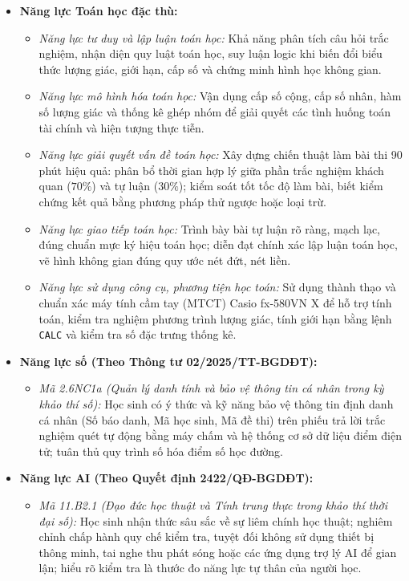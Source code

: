 \documentclass[12pt, a4paper]{article}
\begin{document}
\begin{itemize}[leftmargin=1.2cm]
    \item \textbf{Năng lực Toán học đặc thù:}
    \begin{itemize}[leftmargin=0.6cm]
        \item \textit{Năng lực tư duy và lập luận toán học:} Khả năng phân tích câu hỏi trắc nghiệm, nhận diện quy luật toán học, suy luận logic khi biến đổi biểu thức lượng giác, giới hạn, cấp số và chứng minh hình học không gian.
        \item \textit{Năng lực mô hình hóa toán học:} Vận dụng cấp số cộng, cấp số nhân, hàm số lượng giác và thống kê ghép nhóm để giải quyết các tình huống toán tài chính và hiện tượng thực tiễn.
        \item \textit{Năng lực giải quyết vấn đề toán học:} Xây dựng chiến thuật làm bài thi 90 phút hiệu quả: phân bổ thời gian hợp lý giữa phần trắc nghiệm khách quan ($70\%$) và tự luận ($30\%$); kiểm soát tốt tốc độ làm bài, biết kiểm chứng kết quả bằng phương pháp thử ngược hoặc loại trừ.
        \item \textit{Năng lực giao tiếp toán học:} Trình bày bài tự luận rõ ràng, mạch lạc, đúng chuẩn mực ký hiệu toán học; diễn đạt chính xác lập luận toán học, vẽ hình không gian đúng quy ước nét đứt, nét liền.
        \item \textit{Năng lực sử dụng công cụ, phương tiện học toán:} Sử dụng thành thạo và chuẩn xác máy tính cầm tay (MTCT) Casio fx-580VN X để hỗ trợ tính toán, kiểm tra nghiệm phương trình lượng giác, tính giới hạn bằng lệnh \texttt{CALC} và kiểm tra số đặc trưng thống kê.
    \end{itemize}

    \item \textbf{Năng lực số (Theo Thông tư 02/2025/TT-BGDĐT):}
    \begin{itemize}[leftmargin=0.6cm]
        \item \textit{Mã 2.6NC1a (Quản lý danh tính và bảo vệ thông tin cá nhân trong kỳ khảo thí số):} Học sinh có ý thức và kỹ năng bảo vệ thông tin định danh cá nhân (Số báo danh, Mã học sinh, Mã đề thi) trên phiếu trả lời trắc nghiệm quét tự động bằng máy chấm và hệ thống cơ sở dữ liệu điểm điện tử; tuân thủ quy trình số hóa điểm số học đường.
    \end{itemize}

    \item \textbf{Năng lực AI (Theo Quyết định 2422/QĐ-BGDĐT):}
    \begin{itemize}[leftmargin=0.6cm]
        \item \textit{Mã 11.B2.1 (Đạo đức học thuật và Tính trung thực trong khảo thí thời đại số):} Học sinh nhận thức sâu sắc về sự liêm chính học thuật; nghiêm chỉnh chấp hành quy chế kiểm tra, tuyệt đối không sử dụng thiết bị thông minh, tai nghe thu phát sóng hoặc các ứng dụng trợ lý AI để gian lận; hiểu rõ kiểm tra là thước đo năng lực tự thân của người học.
    \end{itemize}


\end{itemize}
\end{document}
